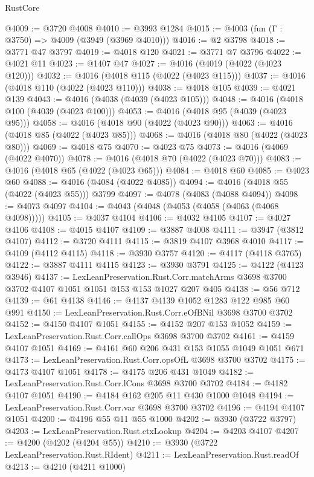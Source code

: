 \begin{lexlean}{RustCore}
\begin{coremodule}
@4009 := @3720 @4008
@4010 := @3993 @1284
@4015 := @4003 (fun (Γ : @3750) => @4009 (@3949 (@3969 @4010)))
@4016 := @2 @3798
@4018 := @3771 @47 @3797
@4019 := @4018 @120
@4021 := @3771 @7 @3796
@4022 := @4021 @11
@4023 := @1407 @47
@4027 := @4016 (@4019 (@4022 (@4023 @120)))
@4032 := @4016 (@4018 @115 (@4022 (@4023 @115)))
@4037 := @4016 (@4018 @110 (@4022 (@4023 @110)))
@4038 := @4018 @105
@4039 := @4021 @139
@4043 := @4016 (@4038 (@4039 (@4023 @105)))
@4048 := @4016 (@4018 @100 (@4039 (@4023 @100)))
@4053 := @4016 (@4018 @95 (@4039 (@4023 @95)))
@4058 := @4016 (@4018 @90 (@4022 (@4023 @90)))
@4063 := @4016 (@4018 @85 (@4022 (@4023 @85)))
@4068 := @4016 (@4018 @80 (@4022 (@4023 @80)))
@4069 := @4018 @75
@4070 := @4023 @75
@4073 := @4016 (@4069 (@4022 @4070))
@4078 := @4016 (@4018 @70 (@4022 (@4023 @70)))
@4083 := @4016 (@4018 @65 (@4022 (@4023 @65)))
@4084 := @4018 @60
@4085 := @4023 @60
@4088 := @4016 (@4084 (@4022 @4085))
@4094 := @4016 (@4018 @55 (@4022 (@4023 @55))) @3799
@4097 := @4078 (@4083 (@4088 @4094))
@4098 := @4073 @4097
@4104 := @4043 (@4048 (@4053 (@4058 (@4063 (@4068 @4098)))))
@4105 := @4037 @4104
@4106 := @4032 @4105
@4107 := @4027 @4106
@4108 := @4015 @4107
@4109 := @3887 @4008
@4111 := @3947 (@3812 @4107)
@4112 := @3720 @4111
@4115 := @3819 @4107 @3968 @4010
@4117 := @4109 (@4112 @4115)
@4118 := @3930 @3757
@4120 := @4117 (@4118 @3765)
@4122 := @3887 @4111 @4115
@4123 := @3930 @3791
@4125 := @4122 (@4123 @3946)
@4137 := LexLeanPreservation.Rust.Corr.matchArms
    @3698
    @3700
    @3702
    @4107
    @1051
    @1051
    @153
    @153
    @1027
    @207
    @405
@4138 := @56 @712
@4139 := @61 @4138
@4146 := @4137 @4139 @1052 @1283 @122 @985 @60 @991
@4150 := LexLeanPreservation.Rust.Corr.eOfBNil @3698 @3700 @3702
@4152 := @4150 @4107 @1051
@4155 := @4152 @207 @153 @1052
@4159 := LexLeanPreservation.Rust.Corr.callOps @3698 @3700 @3702
@4161 := @4159 @4107 @1051
@4169 := @4161 @60 @206 @431 @153 @1055 @1049 @1051 @671
@4173 := LexLeanPreservation.Rust.Corr.opsOfL @3698 @3700 @3702
@4175 := @4173 @4107 @1051
@4178 := @4175 @206 @431 @1049
@4182 := LexLeanPreservation.Rust.Corr.lCons @3698 @3700 @3702
@4184 := @4182 @4107 @1051
@4190 := @4184 @162 @205 @11 @430 @1000 @1048
@4194 := LexLeanPreservation.Rust.Corr.var @3698 @3700 @3702
@4196 := @4194 @4107 @1051
@4200 := @4196 @55 @11 @55 @1000
@4202 := @3930 (@3722 @3797)
@4203 := LexLeanPreservation.Rust.ctxLookup
@4204 := @4203 @4107
@4207 := @4200 (@4202 (@4204 @55))
@4210 := @3930 (@3722 LexLeanPreservation.Rust.RIdent)
@4211 := LexLeanPreservation.Rust.readOf
@4213 := @4210 (@4211 @1000)

\end{coremodule}
\end{lexlean}
